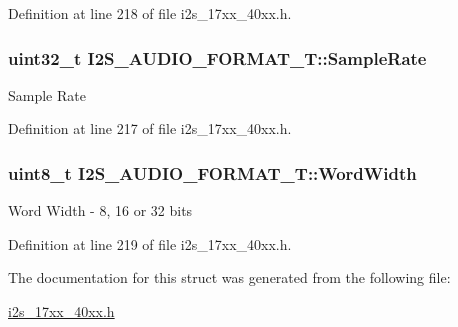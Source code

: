 Definition at line 218 of file i2s\+\_\+17xx\+\_\+40xx.\+h.

\subsubsection[{\texorpdfstring{Sample\+Rate}{SampleRate}}]{\setlength{\rightskip}{0pt plus 5cm}uint32\+\_\+t I2\+S\+\_\+\+A\+U\+D\+I\+O\+\_\+\+F\+O\+R\+M\+A\+T\+\_\+\+T\+::\+Sample\+Rate}\hypertarget{structI2S__AUDIO__FORMAT__T_aef370fad5b70b5226a2f8a780bd934d9}{}\label{structI2S__AUDIO__FORMAT__T_aef370fad5b70b5226a2f8a780bd934d9}
Sample Rate 

Definition at line 217 of file i2s\+\_\+17xx\+\_\+40xx.\+h.

\subsubsection[{\texorpdfstring{Word\+Width}{WordWidth}}]{\setlength{\rightskip}{0pt plus 5cm}uint8\+\_\+t I2\+S\+\_\+\+A\+U\+D\+I\+O\+\_\+\+F\+O\+R\+M\+A\+T\+\_\+\+T\+::\+Word\+Width}\hypertarget{structI2S__AUDIO__FORMAT__T_a5b21d5d739e0eb7e66c898618fcd4605}{}\label{structI2S__AUDIO__FORMAT__T_a5b21d5d739e0eb7e66c898618fcd4605}
Word Width -\/ 8, 16 or 32 bits 

Definition at line 219 of file i2s\+\_\+17xx\+\_\+40xx.\+h.



The documentation for this struct was generated from the following file\+:\begin{DoxyCompactItemize}
\item 
\hyperlink{i2s__17xx__40xx_8h}{i2s\+\_\+17xx\+\_\+40xx.\+h}\end{DoxyCompactItemize}
